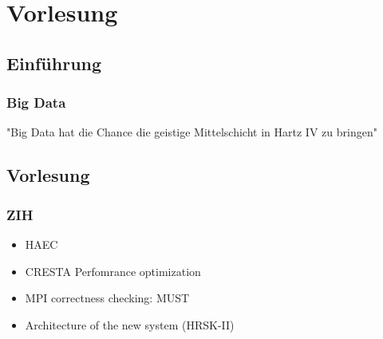 
\chapter{Vorlesung}
\section{Einführung}

\subsection{Big Data}
"Big Data hat die Chance die geistige Mittelschicht in Hartz IV zu bringen"

\section{Vorlesung}
\subsection{ZIH}
\begin{itemize}
	\item HAEC
	\item CRESTA Perfomrance optimization
	\item MPI correctness checking: MUST
	\item Architecture of the new system (HRSK-II)
\end{itemize}

